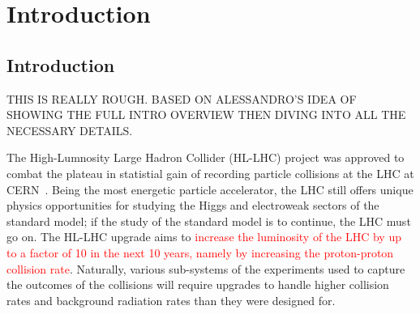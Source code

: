 
\chapter{Introduction}
\label{chap:intro}


\section{Introduction}

THIS IS REALLY ROUGH. BASED ON ALESSANDRO'S IDEA OF SHOWING THE FULL INTRO OVERVIEW THEN DIVING INTO ALL THE NECESSARY DETAILS.

The High-Lumnosity Large Hadron Collider (HL-LHC) project was approved to combat the plateau in statistial gain of recording particle collisions at the LHC at CERN~\cite{apollinari_high-luminosity_2017}. Being the most energetic particle accelerator, the LHC still offers unique physics opportunities for studying the Higgs and electroweak sectors of the standard model; if the study of the standard model is to continue, the LHC must go on. The HL-LHC upgrade aims to \textcolor{red}{increase the luminosity of the LHC by up to a factor of 10 in the next 10 years, namely by increasing the proton-proton collision rate}. Naturally, various sub-systems of the experiments used to capture the outcomes of the collisions will require upgrades to handle higher collision rates and background radiation rates than they were designed for. 

